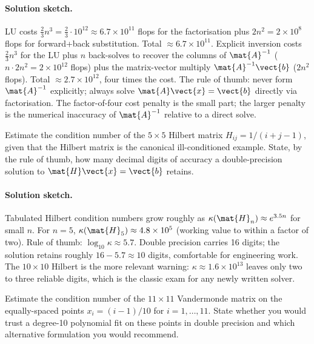 \paragraph{Solution sketch.}
LU costs $\tfrac{2}{3}n^{3} = \tfrac{2}{3} \cdot 10^{12} \approx
6.7 \times 10^{11}$ flops for the factorisation plus $2 n^{2} = 2
\times 10^{8}$ flops for forward+back substitution. Total $\approx
6.7 \times 10^{11}$. Explicit inversion costs $\tfrac{2}{3}n^{3}$
for the LU plus $n$ back-solves to recover the columns of
$\mat{A}^{-1}$ ($n \cdot 2 n^{2} = 2 \times 10^{12}$ flops) plus
the matrix-vector multiply $\mat{A}^{-1}\vect{b}$ ($2 n^{2}$ flops).
Total $\approx 2.7 \times 10^{12}$, four times the cost. The rule
of thumb: never form $\mat{A}^{-1}$ explicitly; always solve
$\mat{A}\vect{x} = \vect{b}$ directly via factorisation. The
factor-of-four cost penalty is the small part; the larger penalty
is the numerical inaccuracy of $\mat{A}^{-1}$ relative to a direct
solve.

\begin{exercise}
Estimate the condition number of the $5 \times 5$ Hilbert matrix
$H_{ij} = 1/(i+j-1)$, given that the Hilbert matrix is the
canonical ill-conditioned example. State, by the rule of thumb,
how many decimal digits of accuracy a double-precision solution
to $\mat{H}\vect{x} = \vect{b}$ retains.
\end{exercise}

\paragraph{Solution sketch.}
Tabulated Hilbert condition numbers grow roughly as $\kappa(\mat{H}_{n})
\approx e^{3.5 n}$ for small $n$. For $n = 5$, $\kappa(\mat{H}_{5})
\approx 4.8 \times 10^{5}$ (working value to within a factor of
two). Rule of thumb: $\log_{10}\kappa \approx 5.7$. Double
precision carries 16 digits; the solution retains roughly $16 -
5.7 \approx 10$ digits, comfortable for engineering work. The
$10 \times 10$ Hilbert is the more relevant warning: $\kappa
\approx 1.6 \times 10^{13}$ leaves only two to three reliable
digits, which is the classic exam for any newly written solver.

\begin{exercise}
Estimate the condition number of the $11 \times 11$ Vandermonde
matrix on the equally-spaced points $x_{i} = (i-1)/10$ for $i = 1,
\ldots, 11$. State whether you would trust a degree-10 polynomial
fit on these points in double precision and which alternative
formulation you would recommend.
\end{exercise}

